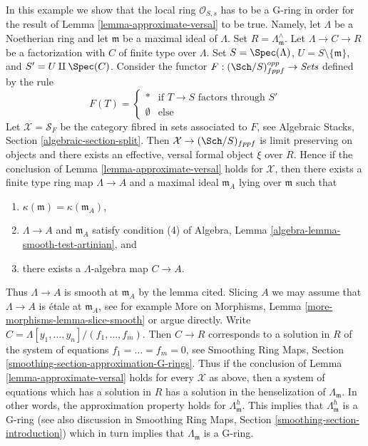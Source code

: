 \begin{example}
\label{example-approximate-versal-implies}
In this example we show that the local ring $\mathcal{O}_{S, s}$ has to be
a G-ring in order for the result of Lemma \ref{lemma-approximate-versal} to
be true. Namely, let $\Lambda$ be a Noetherian ring and let $\mathfrak m$
be a maximal ideal of $\Lambda$. Set $R = \Lambda_\mathfrak m^\wedge$. Let
$\Lambda \to C \to R$ be a factorization with $C$ of finite type over
$\Lambda$. Set $S = \Spec(\Lambda)$, $U = S \setminus \{\mathfrak m\}$, and
$S' = U \amalg \Spec(C)$. Consider the functor
$F : (\Sch/S)_{fppf}^{opp} \to \textit{Sets}$ defined by the rule
$$
F(T) = 
\left\{
\begin{matrix}
* & \text{if }T \to S\text{ factors through }S' \\
\emptyset & \text{else}
\end{matrix}
\right.
$$
Let $\mathcal{X} = \mathcal{S}_F$ be the category fibred in sets associated
to $F$, see Algebraic Stacks, Section \ref{algebraic-section-split}.
Then $\mathcal{X} \to (\Sch/S)_{fppf}$ is limit preserving on objects and
there exists an effective, versal formal object $\xi$ over $R$.
Hence if the conclusion of Lemma \ref{lemma-approximate-versal} holds
for $\mathcal{X}$, then there exists a finite type ring map $\Lambda \to A$
and a maximal ideal $\mathfrak m_A$ lying over $\mathfrak m$ such that
\begin{enumerate}
\item $\kappa(\mathfrak m) = \kappa(\mathfrak m_A)$,
\item $\Lambda \to A$ and $\mathfrak m_A$ satisfy condition (4) of
Algebra, Lemma \ref{algebra-lemma-smooth-test-artinian}, and
\item there exists a $\Lambda$-algebra map $C \to A$.
\end{enumerate}
Thus $\Lambda \to A$ is smooth at $\mathfrak m_A$ by the lemma cited.
Slicing $A$ we may assume that $\Lambda \to A$ is \'etale at
$\mathfrak m_A$, see for example
More on Morphisms, Lemma \ref{more-morphisms-lemma-slice-smooth}
or argue directly. Write $C = \Lambda[y_1, \ldots, y_n]/(f_1, \ldots, f_m)$.
Then $C \to R$ corresponds to a solution in $R$ of the system of equations
$f_1 = \ldots = f_m = 0$, see Smoothing Ring Maps, Section
\ref{smoothing-section-approximation-G-rings}.
Thus if the conclusion of
Lemma \ref{lemma-approximate-versal} holds for every $\mathcal{X}$ as
above, then a system of equations which has a solution in $R$ has a
solution in the henselization of $\Lambda_{\mathfrak m}$.
In other words, the approximation property holds for
$\Lambda_{\mathfrak m}^h$. This implies that $\Lambda_{\mathfrak m}^h$
is a G-ring (see also discussion in
Smoothing Ring Maps, Section \ref{smoothing-section-introduction})
which in turn implies that $\Lambda_{\mathfrak m}$ is a G-ring.
\end{example}






